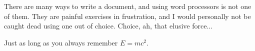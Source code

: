 \documentclass[a4paper,11pt]{article}
\begin{document}
There are many ways to write a document, and using word processors is not one of them. They are painful exercises in frustration, and I would personally not be caught dead using one out of choice. Choice, ah, that elusive force...

Just as long as you always remember $E=mc^{2}$.
\end{document}
